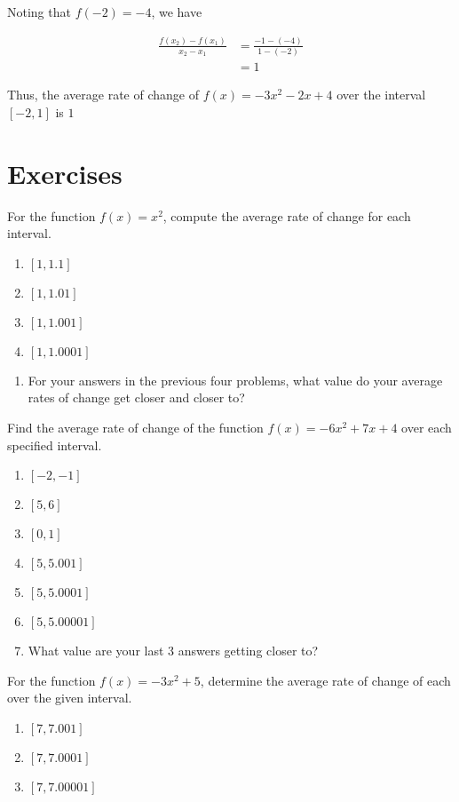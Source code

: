\begin{solution}
Noting that $f(-2) = -4$, we have

\begin{align*}
    \frac{f(x_2)-f(x_1)}{x_2-x_1} &= \frac{-1-(-4)}{1-(-2)} \\[4pt]
    &= 1
\end{align*}

Thus, the average rate of change of $f(x) = -3x^2-2x+4$ over the interval $[-2,1]$ is $\boxed{1}$

\end{solution}

\section{Exercises}

For the function $f(x) = x^2$, compute the average rate of change for each interval.
\begin{enumerate}
\item $[1, 1.1]$
\item $[1, 1.01]$
\item $[1, 1.001]$
\item $[1,1.0001]$
\setcounter{Review}{\value{enumi}}
\end{enumerate}

\begin{enumerate}
\setcounter{enumi}{\value{Review}}
\item For your answers in the previous four problems, what value do your average rates of change get closer and closer to?
\setcounter{Review}{\value{enumi}}
\end{enumerate}

Find the average rate of change of the function $f(x) = -6x^2 + 7x + 4$ over each specified interval.
\begin{enumerate}
\setcounter{enumi}{\value{Review}}
\item $[-2, -1]$
\item $[5, 6]$
\item $[0, 1]$
\item $[5,5.001]$
\item $[5,5.0001]$
\item $[5,5.00001]$
\item What value are your last 3 answers getting closer to?
\setcounter{Review}{\value{enumi}}
\end{enumerate}

For the function $f(x) = -3x^2 + 5$, determine the average rate of change of each over the given interval.
\begin{enumerate}
\setcounter{enumi}{\value{Review}}
    \item $[7, 7.001]$
    \item $[7, 7.0001]$
    \item $[7, 7.00001]$
\setcounter{Review}{\value{enumi}}
\end{enumerate}

